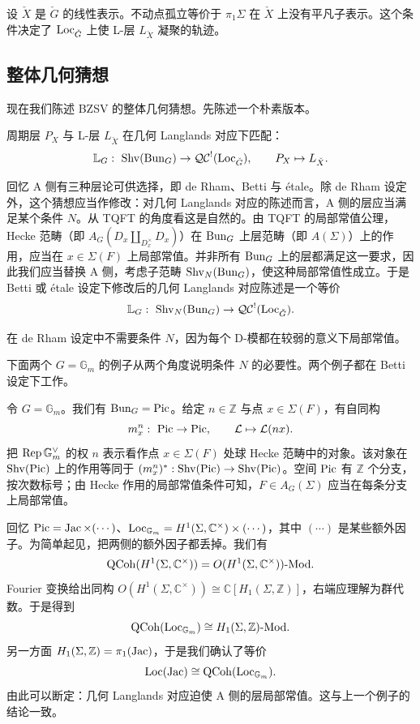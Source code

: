 \begin{exmp}
设 $\check X$ 是 $\check G$ 的线性表示。不动点孤立等价于 $\pi_1\Sigma$ 在 $\check X$ 上没有平凡子表示。这个条件决定了 $\operatorname{Loc}_{\check G}$ 上使 L-层 $L_{\check X}$ 凝聚的轨迹。
\end{exmp}

\subsection{整体几何猜想}

现在我们陈述 BZSV 的整体几何猜想。先陈述一个朴素版本。

\begin{conj}[朴素整体几何猜想]
周期层 $P_X$ 与 L-层 $L_{\check X}$ 在几何 Langlands 对应下匹配：
\[
  \mathbb L_G:\ \Shv(\Bun_G)\to\QC^!(\Loc_{\check G}),\qquad P_X\mapsto L_{\check X}.
\]
\end{conj}

回忆 A 侧有三种层论可供选择，即 de Rham、Betti 与 étale。除 de Rham 设定外，这个猜想应当作修改：对几何 Langlands 对应的陈述而言，A 侧的层应当满足某个条件 $N$。从 TQFT 的角度看这是自然的。由 TQFT 的局部常值公理，Hecke 范畴（即 $A_G(D_x\coprod_{D_x^\times}D_x)$）在 $\operatorname{Bun}_G$ 上层范畴（即 $A(\Sigma)$）上的作用，应当在 $x\in\Sigma(F)$ 上局部常值。并非所有 $\operatorname{Bun}_G$ 上的层都满足这一要求，因此我们应当替换 A 侧，考虑子范畴 $\operatorname{Shv}_N(\operatorname{Bun}_G)$，使这种局部常值性成立。于是 Betti 或 étale 设定下修改后的几何 Langlands 对应陈述是一个等价
\[
  \mathbb L_G:\ \operatorname{Shv}_N(\operatorname{Bun}_G)\to\mathcal{QC}^!(\operatorname{Loc}_{\check G}).
\]

\begin{rem}
在 de Rham 设定中不需要条件 $N$，因为每个 D-模都在较弱的意义下局部常值。
\end{rem}

下面两个 $G=\mathbb G_m$ 的例子从两个角度说明条件 $N$ 的必要性。两个例子都在 Betti 设定下工作。

\begin{exmp}[TQFT]
令 $G=\mathbb G_m$。我们有 $\operatorname{Bun}_G=\operatorname{Pic}$。给定 $n\in\mathbb Z$ 与点 $x\in\Sigma(F)$，有自同构
\[
  m_x^n:\ \operatorname{Pic}\to\operatorname{Pic},\qquad \mathcal L\mapsto\mathcal L(nx).
\]
把 $\operatorname{Rep}\mathbb G_m^\vee$ 的权 $n$ 表示看作点 $x\in\Sigma(F)$ 处球 Hecke 范畴中的对象。该对象在 $\operatorname{Shv}(\operatorname{Pic})$ 上的作用等同于 $(m_x^n)^*:\operatorname{Shv}(\operatorname{Pic})\to\operatorname{Shv}(\operatorname{Pic})$。空间 $\operatorname{Pic}$ 有 $\mathbb Z$ 个分支，按次数标号；由 Hecke 作用的局部常值条件可知，$F\in A_G(\Sigma)$ 应当在每条分支上局部常值。
\end{exmp}

\begin{exmp}[直接计算]
回忆 $\operatorname{Pic}=\operatorname{Jac}\times(\cdots)$、$\operatorname{Loc}_{\mathbb G_m}=H^1(\Sigma,\mathbb C^\times)\times(\cdots)$，其中 $(\cdots)$ 是某些额外因子。为简单起见，把两侧的额外因子都丢掉。我们有
\[
  \operatorname{QCoh}(H^1(\Sigma,\mathbb C^\times))=O(H^1(\Sigma,\mathbb C^\times))\text{-}\mathrm{Mod}.
\]
Fourier 变换给出同构 $O(H^1(\Sigma,\mathbb C^\times))\cong\mathbb C[H_1(\Sigma,\mathbb Z)]$，右端应理解为群代数。于是得到
\[
  \operatorname{QCoh}(\operatorname{Loc}_{\mathbb G_m})\cong H_1(\Sigma,\mathbb Z)\text{-}\mathrm{Mod}.
\]
另一方面 $H_1(\Sigma,\mathbb Z)=\pi_1(\operatorname{Jac})$，于是我们确认了等价
\[
  \operatorname{Loc}(\operatorname{Jac})\cong\operatorname{QCoh}(\operatorname{Loc}_{\mathbb G_m}).
\]
由此可以断定：几何 Langlands 对应迫使 A 侧的层局部常值。这与上一个例子的结论一致。
\end{exmp}

